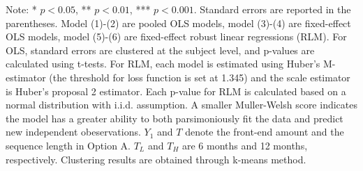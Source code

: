 \documentclass[12pt]{article}
\begin{document}
\begin{table}
    \vspace*{4pt}
    \centering
    \begin{minipage}{1.0\textwidth}
    {\par\footnotesize Note: * $p<0.05$, ** $p<0.01$, *** $p<0.001$. Standard errors are reported in the parentheses. Model (1)-(2) are pooled OLS models, model (3)-(4) are fixed-effect OLS models, model (5)-(6) are fixed-effect robust linear regressions (RLM). For OLS, standard errors are clustered at the subject level, and p-values are calculated using t-tests. For RLM, each model is estimated using Huber's M-estimator (the threshold for loss function is set at 1.345) and the scale estimator is Huber's proposal 2 estimator. Each p-value for RLM is calculated based on a normal distribution with i.i.d. assumption. A smaller Muller-Welsh score indicates the model has a greater ability to both parsimoniously fit the data and predict new independent obeservations. $Y_1$ and $T$ denote the front-end amount and the sequence length in Option A. $T_L$ and $T_H$ are 6 months and 12 months, respectively. Clustering results are obtained through k-means method.}
    \end{minipage}
    \label{tab:seq_value_reg}
\end{table}
\end{document}

